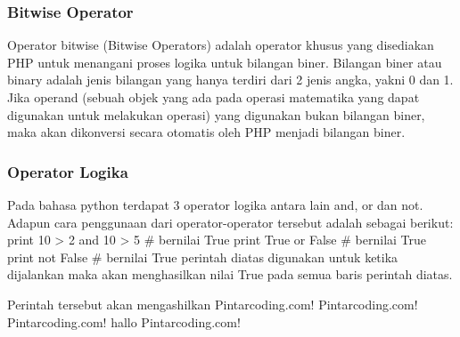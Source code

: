 \subsubsection{Bitwise Operator}
Operator bitwise (Bitwise Operators) adalah operator khusus yang disediakan PHP untuk menangani proses logika untuk bilangan biner. Bilangan biner atau binary adalah jenis bilangan yang hanya terdiri dari 2 jenis angka, yakni 0 dan 1. Jika operand (sebuah objek yang ada pada operasi matematika yang dapat digunakan untuk melakukan operasi) yang digunakan bukan bilangan biner, maka akan dikonversi secara otomatis oleh PHP menjadi bilangan biner.

\subsubsection{Operator Logika}
Pada bahasa python terdapat 3 operator logika antara lain and, or dan not. Adapun cara penggunaan dari operator-operator tersebut adalah sebagai berikut:
print 10 > 2 and 10 > 5 # bernilai True
print True or False # bernilai True
print not False # bernilai True
perintah diatas digunakan untuk ketika dijalankan maka akan menghasilkan nilai True pada semua baris perintah diatas.

Perintah tersebut akan mengashilkan
Pintarcoding.com! Pintarcoding.com! Pintarcoding.com! 
hallo Pintarcoding.com!

